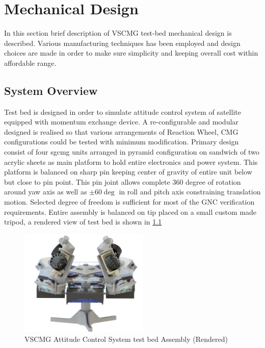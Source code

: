 \chapter{Mechanical Design}
\label{chap:7}
In this section brief description of VSCMG test-bed mechanical design is described. Various manufacturing techniques has been employed and design choices are made in order to make sure simplicity and keeping overall cost within affordable range. 
\section{System Overview}
Test bed is designed in order to simulate attitude control system of satellite equipped with momentum exchange device. A re-configurable and modular designed is realised so that various arrangements of Reaction Wheel, CMG configurations could be tested with minimum modification. Primary design consist of four \acrshort{sgcmg} units arranged in pyramid configuration on sandwich of two acrylic sheets as main platform to hold entire electronics and power system. This platform is balanced on sharp pin keeping center of gravity of entire unit below but close to pin point. This pin joint allows complete 360 degree of rotation around yaw axis as well as $\pm 60 \deg$ in roll and pitch axis constraining translation motion. Selected degree of freedom is sufficient for most of the GNC verification requirements. Entire assembly is balanced on tip placed on a small custom made tripod, a rendered view of test bed is shown in \ref{fig:my_AssemblyACR}

\begin{figure}[ht]
    \centering
    \includegraphics[width=0.55\textwidth]{figures/Assembly/AssemblyACR - Transperent.pdf}
    \caption{VSCMG Attitude Control System test bed Assembly (Rendered)}
    \label{fig:my_AssemblyACR}
\end{figure}

